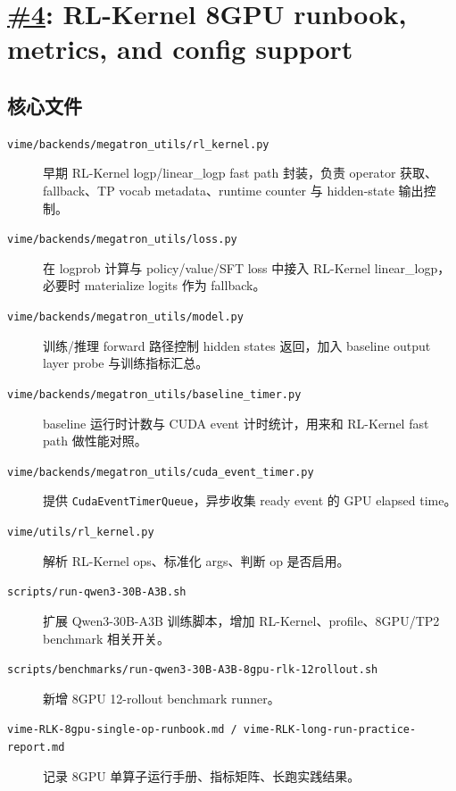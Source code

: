 \documentclass[11pt,a4paper]{ctexart}
\newcommand{\code}[1]{{\small\nolinkurl{#1}}}
\newcommand{\pr}[1]{\href{https://github.com/RL-Align/vime/pull/#1}{\##1}}
\newcommand{\fileitem}[2]{\item[\code{#1}] #2}
\begin{document}
\newpage
\section{\pr{4}: RL-Kernel 8GPU runbook, metrics, and config support}

\subsection{核心文件}
\begin{description}
  \fileitem{vime/backends/megatron_utils/rl_kernel.py}{早期 RL-Kernel logp/linear\_logp fast path 封装，负责 operator 获取、fallback、TP vocab metadata、runtime counter 与 hidden-state 输出控制。}
  \fileitem{vime/backends/megatron_utils/loss.py}{在 logprob 计算与 policy/value/SFT loss 中接入 RL-Kernel linear\_logp，必要时 materialize logits 作为 fallback。}
  \fileitem{vime/backends/megatron_utils/model.py}{训练/推理 forward 路径控制 hidden states 返回，加入 baseline output layer probe 与训练指标汇总。}
  \fileitem{vime/backends/megatron_utils/baseline_timer.py}{baseline 运行时计数与 CUDA event 计时统计，用来和 RL-Kernel fast path 做性能对照。}
  \fileitem{vime/backends/megatron_utils/cuda_event_timer.py}{提供 \code{CudaEventTimerQueue}，异步收集 ready event 的 GPU elapsed time。}
  \fileitem{vime/utils/rl_kernel.py}{解析 RL-Kernel ops、标准化 args、判断 op 是否启用。}
  \fileitem{scripts/run-qwen3-30B-A3B.sh}{扩展 Qwen3-30B-A3B 训练脚本，增加 RL-Kernel、profile、8GPU/TP2 benchmark 相关开关。}
  \fileitem{scripts/benchmarks/run-qwen3-30B-A3B-8gpu-rlk-12rollout.sh}{新增 8GPU 12-rollout benchmark runner。}
  \fileitem{vime-RLK-8gpu-single-op-runbook.md / vime-RLK-long-run-practice-report.md}{记录 8GPU 单算子运行手册、指标矩阵、长跑实践结果。}
\end{description}
\end{document}
